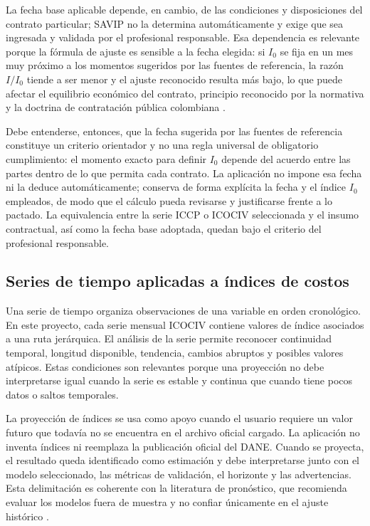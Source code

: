 \documentclass[12pt,letterpaper]{article}
\providecommand{\parencite}{\citep}
\newcommand{\ICOCIV}{ICOCIV}
\newcommand{\ICCP}{ICCP}
\newcommand{\DANE}{DANE}
\begin{document}
La fecha base aplicable depende, en cambio, de las condiciones y disposiciones del contrato particular; SAVIP no la determina automáticamente y exige que sea ingresada y validada por el profesional responsable. Esa dependencia es relevante porque la fórmula de ajuste es sensible a la fecha elegida: si \(I_0\) se fija en un mes muy próximo a los momentos sugeridos por las fuentes de referencia, la razón \(I/I_0\) tiende a ser menor y el ajuste reconocido resulta más bajo, lo que puede afectar el equilibrio económico del contrato, principio reconocido por la normativa y la doctrina de contratación pública colombiana \parencite{cce2024_equilibrio}.

Debe entenderse, entonces, que la fecha sugerida por las fuentes de referencia constituye un criterio orientador y no una regla universal de obligatorio cumplimiento: el momento exacto para definir \(I_0\) depende del acuerdo entre las partes dentro de lo que permita cada contrato. La aplicación no impone esa fecha ni la deduce automáticamente; conserva de forma explícita la fecha y el índice \(I_0\) empleados, de modo que el cálculo pueda revisarse y justificarse frente a lo pactado. La equivalencia entre la serie \ICCP{} o \ICOCIV{} seleccionada y el insumo contractual, así como la fecha base adoptada, quedan bajo el criterio del profesional responsable.

\subsection{Series de tiempo aplicadas a índices de costos}

Una serie de tiempo organiza observaciones de una variable en orden cronológico. En este proyecto, cada serie mensual \ICOCIV{} contiene valores de índice asociados a una ruta jerárquica. El análisis de la serie permite reconocer continuidad temporal, longitud disponible, tendencia, cambios abruptos y posibles valores atípicos. Estas condiciones son relevantes porque una proyección no debe interpretarse igual cuando la serie es estable y continua que cuando tiene pocos datos o saltos temporales.

La proyección de índices se usa como apoyo cuando el usuario requiere un valor futuro que todavía no se encuentra en el archivo oficial cargado. La aplicación no inventa índices ni reemplaza la publicación oficial del \DANE. Cuando se proyecta, el resultado queda identificado como estimación y debe interpretarse junto con el modelo seleccionado, las métricas de validación, el horizonte y las advertencias. Esta delimitación es coherente con la literatura de pronóstico, que recomienda evaluar los modelos fuera de muestra y no confiar únicamente en el ajuste histórico \parencite{hyndman2021fpp3}.
\end{document}
